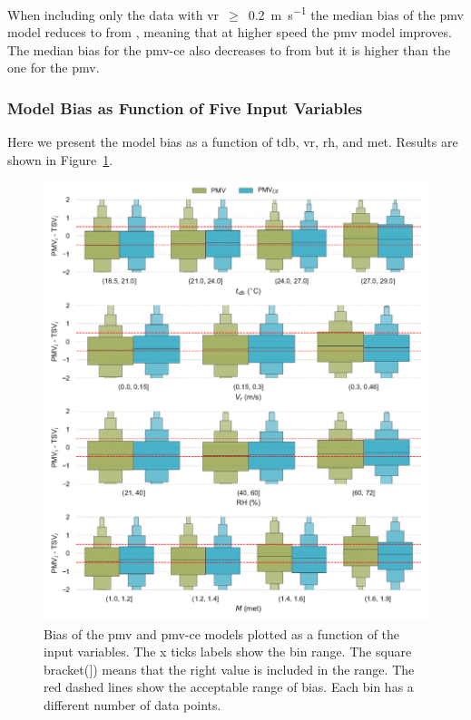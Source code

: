 When including only the data with \ac{vr}~$\geq$~\qty{0.2}{\m\per\s} the median bias of the \ac{pmv} model reduces to  from , meaning that at higher speed the \ac{pmv} model improves.
The median bias for the \ac{pmv-ce} also decreases to  from  but it is higher than the one for the \ac{pmv}.

\subsubsection{Model Bias as Function of Five Input Variables}\label{subsubsec:model-bias-variable}
Here we present the model bias as a function of \ac{tdb}, \ac{vr}, \ac{rh}, and \ac{met}.
Results are shown in Figure~\ref{fig:bias_models}.
\begin{figure}[htb!]
    \centering
    \includegraphics[width=\textwidth]{figures/bias_models}
    \caption{Bias of the \ac{pmv} and \ac{pmv-ce} models plotted as a function of the input variables.
    The x ticks labels show the bin range.
    The square bracket($]$) means that the right value is included in the range.
    The red dashed lines show the acceptable range of bias.
    Each bin has a different number of data points.
    }
    \label{fig:bias_models}
\end{figure}
